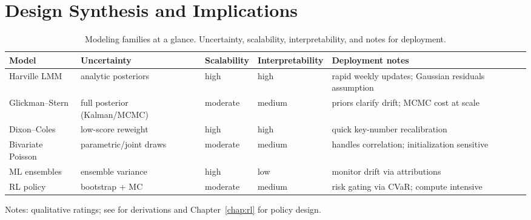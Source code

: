 \section{Design Synthesis and Implications}
\label{sec:synth}

\begin{table}[p]
  \vspace*{\fill}
  \centering
  \begin{adjustwidth}{-0.35in}{-0.35in}
  \begin{threeparttable}
  \captionsetup{justification=centering}
  \caption{Modeling families at a glance. Uncertainty, scalability, interpretability, and notes for deployment.}
  \label{tab:model-compare}
  \begingroup
   \small
   \setlength{\tabcolsep}{6pt}%
   \renewcommand{\arraystretch}{1.25}%
   \setlength{\aboverulesep}{0.6ex}%
   \setlength{\belowrulesep}{0.5ex}%
   \begin{tabularx}{\linewidth}{@{} l Y Y Y Y @{} }
     \toprule[1.2pt]
     \textbf{Model} & \textbf{Uncertainty} & \textbf{Scalability} & \textbf{Interpretability} & \textbf{Deployment notes} \\
     \midrule
     Harville LMM & analytic posteriors & high & high & rapid weekly updates; Gaussian residuals assumption \\
     Glickman--Stern & full posterior (Kalman/MCMC) & moderate & medium & priors clarify drift; MCMC cost at scale \\
     Dixon--Coles & low-score reweight & high & high & quick key-number recalibration \\
     Bivariate Poisson & parametric/joint draws & moderate & medium & handles correlation; initialization sensitive \\
     ML ensembles & ensemble variance & high & low & monitor drift via attributions \\
     RL policy & bootstrap + MC & moderate & medium & risk gating via CVaR; compute intensive \\
     \bottomrule[1.2pt]
   \end{tabularx}
  \endgroup
  \begin{tablenotes}[flushleft]\footnotesize
    \item Notes: qualitative ratings; see  for derivations and Chapter~\ref{chap:rl} for policy design.
  \end{tablenotes}
  \end{threeparttable}
  \end{adjustwidth}
  \vspace*{\fill}
\end{table}

